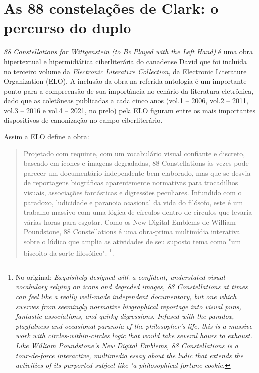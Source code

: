 \documentclass[portuguese]{textolivre}
\begin{document}
\section{As 88 constelações de Clark: o percurso do duplo}
\emph{88 Constellations for Wittgenstein (to Be Played with the Left Hand)} é uma obra hipertextual e hipermidiática ciberliterária do canadense David \textcite{clark2010} que foi incluída no terceiro volume da \emph{Electronic Literature Collection}, da Electronic Literature Organization (ELO). A inclusão da obra na referida antologia é um importante ponto para a compreensão de sua importância no cenário da literatura eletrônica, dado que as coletâneas publicadas a cada cinco anos (vol.1 – 2006, vol.2 – 2011, vol.3 – 2016 e vol.4 – 2021, no prelo) pela ELO figuram entre os mais importantes dispositivos de canonização no campo ciberliterário.

Assim a ELO define a obra:

\begin{quote}
    Projetado com requinte, com um vocabulário visual confiante e discreto, baseado em ícones e imagens degradadas, 88 Constellations às vezes pode parecer um documentário independente bem elaborado, mas que se desvia de reportagens biográficas aparentemente normativas para trocadilhos visuais, associações fantásticas e digressões peculiares. Infundido com o paradoxo, ludicidade e paranoia ocasional da vida do filósofo, este é um trabalho massivo com uma lógica de círculos dentro de círculos que levaria várias horas para esgotar. Como os New Digital Emblems de William Poundstone, 88 Constellations é uma obra-prima multimídia interativa sobre o lúdico que amplia as atividades de seu suposto tema como "um biscoito da sorte filosófico". \cite[n. p., tradução nossa]{electronic2010}\footnote{No original: \emph{Exquisitely designed with a confident, understated visual vocabulary relying on icons and degraded images, 88 Constellations at times can feel like a really well-made independent documentary, but one which swerves from seemingly normative biographical reportage into visual puns, fantastic associations, and quirky digressions. Infused with the paradox, playfulness and occasional paranoia of the philosopher's life, this is a massive work with circles-within-circles logic that would take several hours to exhaust. Like William Poundstone's New Digital Emblems, 88 Constellations is a tour-de-force interactive, multimedia essay about the ludic that extends the activities of its purported subject like "a philosophical fortune cookie}.}.
\end{quote}
\end{document}
